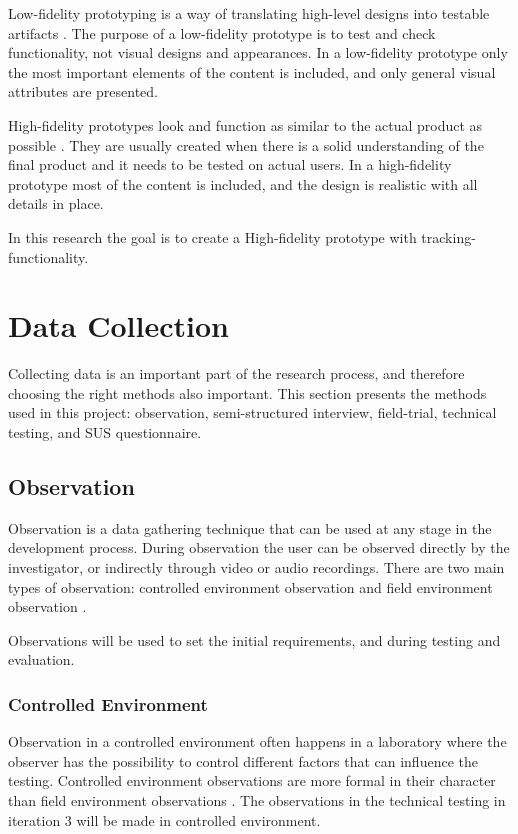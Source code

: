 \documentclass[../Main/thesis.tex]{subfiles}
\begin{document}
Low-fidelity prototyping is a way of translating high-level designs into testable artifacts \citep{Babich2017}.
The purpose of a low-fidelity prototype is to test and check functionality, not visual designs and appearances.
In a low-fidelity prototype only the most important elements of the content is included, and only general visual attributes are presented.

High-fidelity prototypes look and function as similar to the actual product as possible \citep{Babich2017}.
They are usually created when there is a solid understanding of the final product and it needs to be tested on actual users.
In a high-fidelity prototype most of the content is included, and the design is realistic with all details in place.

In this research the goal is to create a High-fidelity prototype with tracking-functionality. 

\section{Data Collection}
Collecting data is an important part of the research process, and therefore choosing the right methods also important.
This section presents the methods used in this project: observation, semi-structured interview, field-trial, technical testing, and SUS questionnaire.

\subsection{Observation}
Observation is a data gathering technique that can be used at any stage in the development process.
During observation the user can be observed directly by the investigator, or indirectly through video or audio recordings.
There are two main types of observation: controlled environment observation and field environment observation \citep{Preece2011}.

Observations will be used to set the initial requirements, and during testing and evaluation.

\subsubsection{Controlled Environment}
Observation in a controlled environment often happens in a laboratory where the observer has the possibility to control different factors that can influence the testing.
Controlled environment observations are more formal in their character than field environment observations \citep{Preece2011}.
The observations in the technical testing in iteration 3 will be made in controlled environment.
\end{document}
